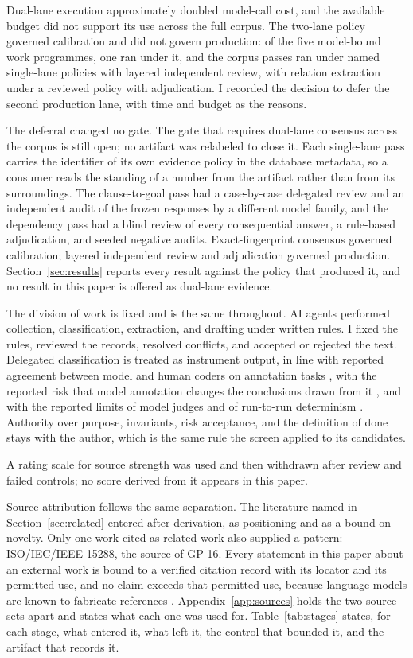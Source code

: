 Dual-lane execution approximately doubled model-call cost, and the available budget did not support its use across the full corpus. The two-lane policy governed calibration and did not govern production: of the five model-bound work programmes, one ran under it, and the corpus passes ran under named single-lane policies with layered independent review, with relation extraction under a reviewed policy with adjudication. I recorded the decision to defer the second production lane, with time and budget as the reasons.

The deferral changed no gate. The gate that requires dual-lane consensus across the corpus is still open; no artifact was relabeled to close it. Each single-lane pass carries the identifier of its own evidence policy in the database metadata, so a consumer reads the standing of a number from the artifact rather than from its surroundings. The clause-to-goal pass had a case-by-case delegated review and an independent audit of the frozen responses by a different model family, and the dependency pass had a blind review of every consequential answer, a rule-based adjudication, and seeded negative audits. Exact-fingerprint consensus governed calibration; layered independent review and adjudication governed production. Section~\ref{sec:results} reports every result against the policy that produced it, and no result in this paper is offered as dual-lane evidence.

The division of work is fixed and is the same throughout. AI agents performed collection, classification, extraction, and drafting under written rules. I fixed the rules, reviewed the records, resolved conflicts, and accepted or rejected the text. Delegated classification is treated as instrument output, in line with reported agreement between model and human coders on annotation tasks \citep{pangakis2023}, with the reported risk that model annotation changes the conclusions drawn from it \citep{baumann2025}, and with the reported limits of model judges and of run-to-run determinism \citep{shi2025,norman2026,atil2025}. Authority over purpose, invariants, risk acceptance, and the definition of done stays with the author, which is the same rule the screen applied to its candidates.

A rating scale for source strength was used and then withdrawn after review and failed controls; no score derived from it appears in this paper.

Source attribution follows the same separation. The literature named in Section~\ref{sec:related} entered after derivation, as positioning and as a bound on novelty. Only one work cited as related work also supplied a pattern: ISO/IEC/IEEE 15288, the source of \hyperlink{gp-16}{GP-16}. Every statement in this paper about an external work is bound to a verified citation record with its locator and its permitted use, and no claim exceeds that permitted use, because language models are known to fabricate references \citep{naser2026}. Appendix~\ref{app:sources} holds the two source sets apart and states what each one was used for. Table~\ref{tab:stages} states, for each stage, what entered it, what left it, the control that bounded it, and the artifact that records it.

